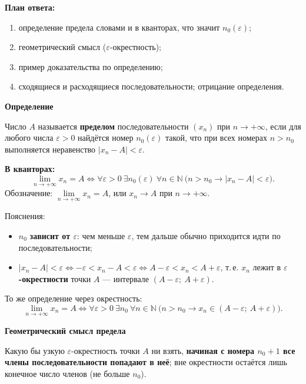 \documentclass[a4paper,11pt]{article}
\newcommand{\N}{\mathbb{N}}
\newcommand{\eps}{\varepsilon}
\newcommand{\kv}{\par\noindent\textbf{\textcolor{oprc!85!black}{В кванторах:}}}
\newcommand{\podr}[1]{\par\needspace{8\baselineskip}\medskip
  {\large\bfseries\textcolor{oprc!80!black}{#1}}\par\nopagebreak\smallskip}
\newcommand{\plan}[1]{\begin{planbox}\textbf{План ответа:}
  \begin{enumerate}[nosep,leftmargin=*,label=\arabic*)]#1\end{enumerate}\end{planbox}}
\begin{document}
\plan{\item определение предела словами и в кванторах, что значит $n_0(\eps)$;
\item геометрический смысл ($\eps$-окрестность);
\item пример доказательства по определению;
\item сходящиеся и расходящиеся последовательности; отрицание определения.}

\podr{Определение}

\begin{opr}
Число $A$ называется \textbf{пределом} последовательности $(x_n)$ при $n \to +\infty$, если для любого
числа $\eps > 0$ найдётся номер $n_0(\eps)$ такой, что при всех номерах $n > n_0$ выполняется
неравенство $|x_n - A| < \eps$.
\kv
\[
  \lim_{n \to +\infty} x_n = A \Leftrightarrow
  \forall \eps > 0\ \exists n_0(\eps)\ \forall n \in \N\ \bigl(n > n_0 \to |x_n - A| < \eps\bigr).
\]
Обозначение: $\lim\limits_{n \to +\infty} x_n = A$, или $x_n \to A$ при $n \to +\infty$.
\end{opr}

Пояснения:
\begin{itemize}[leftmargin=*]
  \item $n_0$ \textbf{зависит от $\eps$}: чем меньше $\eps$, тем дальше обычно приходится идти по последовательности;
  \item $|x_n - A| < \eps \iff -\eps < x_n - A < \eps \iff A - \eps < x_n < A + \eps$, т.\,е. $x_n$ лежит
    в \textbf{$\eps$-окрестности} точки $A$ --- интервале $(A - \eps;\ A + \eps)$.
\end{itemize}

То же определение через окрестность:
\[
  \lim_{n \to +\infty} x_n = A \Leftrightarrow
  \forall \eps > 0\ \exists n_0\ \forall n \in \N\ \bigl(n > n_0 \to x_n \in (A - \eps;\ A + \eps)\bigr).
\]

\podr{Геометрический смысл предела}

Какую бы узкую $\eps$-окрестность точки $A$ ни взять, \textbf{начиная с номера $n_0 + 1$ все члены
последовательности попадают в неё}; вне окрестности остаётся лишь конечное число членов
(не больше $n_0$).
\end{document}
